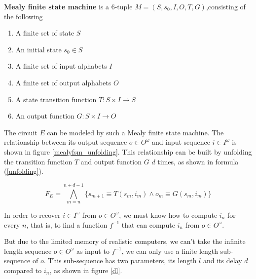 \documentclass[journal]{IEEEtran}
\begin{document}
\begin{definition11}\label{MealyFSM}%
\textbf{Mealy finite state machine} is a 6-tuple $M=(S,s_0,I,O,T,G)$,consisting of the following
\begin{enumerate}
\item A finite set of state $S$
\item An initial state $s_0\in S$
\item A finite set of input alphabets $I$
\item A finite set of output alphabets $O$
\item A state transition function $T: S\times I\to S$
\item An output function $G:S\times I\to O$
\end{enumerate}
\end{definition11}

\vspace{0.2cm}


The circuit $E$ can be modeled by such a Mealy finite state machine.
The relationship between its output sequence $o\in O^{\omega}$ and input sequence $i\in I^{\omega}$ is shown in figure \ref{mealyfsm_unfolding}.
This relationship can be built by unfolding the transition function $T$ and output function $G$ $d$ times,
as shown in formula (\ref{unfolding}).

\begin{equation}\label{unfolding}
F_{E}= \bigwedge_{m=n}^{n+d-1} \Big\{ s_{m+1}\equiv T(s_m,i_m) \wedge  o_m\equiv G(s_m,i_m) \Big\}
\end{equation}

In order to recover $i\in I^{\omega}$ from $o\in O^{\omega}$,
we must know how to compute $i_n$ for every $n$,
that is, to find a function $f^{-1}$ that can compute $i_n$ from $o\in O^{\omega}$.

But due to the limited memory of realistic computers,
we can't take the infinite length sequence $o\in O^{\omega}$ as input to $f^{-1}$,
we can only use a finite length sub-sequence of $o$.
This sub-sequence has two parameters,
its length $l$ and its delay $d$ compared to $i_n$, as shown in figure \ref{dl}.
\end{document}

